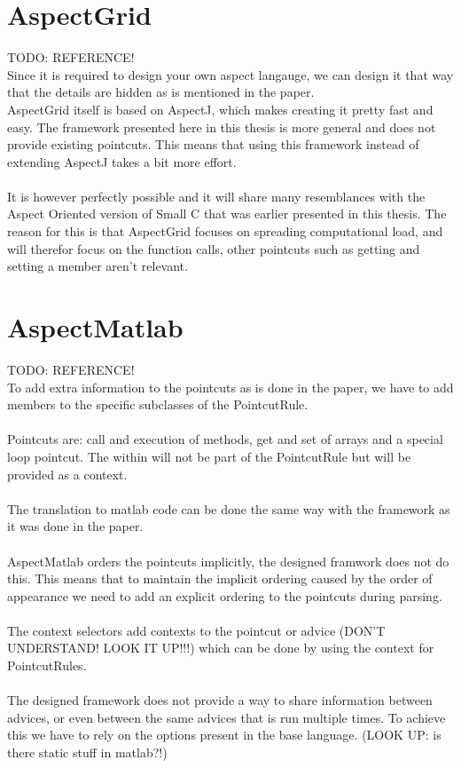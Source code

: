 \documentclass[a4paper]{report}
\begin{document}
\section{AspectGrid}
TODO: REFERENCE!\\
Since it is required to design your own aspect langauge, we can design it that way that the details are hidden as is mentioned in the paper.\\
AspectGrid itself is based on AspectJ, which makes creating it pretty fast and easy. The framework presented here in this thesis is more general and does not provide existing pointcuts. This means that using this framework instead of extending AspectJ takes a bit more effort.\\
\\
It is however perfectly possible and it will share many resemblances with the Aspect Oriented version of Small C that was earlier presented in this thesis. The reason for this is that AspectGrid focuses on spreading computational load, and will therefor focus on the function calls, other pointcuts such as getting and setting a member aren't relevant.
\section{AspectMatlab}
TODO: REFERENCE!\\
To add extra information to the pointcuts as is done in the paper, we have to add members to the specific subclasses of the PointcutRule.\\
\\
Pointcuts are: call and execution of methods, get and set of arrays and a special loop pointcut. The within will not be part of the PointcutRule but will be provided as a context.\\
\\
The translation to matlab code can be done the same way with the framework as it was done in the paper.\\
\\
AspectMatlab orders the pointcuts implicitly, the designed framwork does not do this. This means that to maintain the implicit ordering caused by the order of appearance we need to add an explicit ordering to the pointcuts during parsing.\\
\\
The context selectors add contexts to the pointcut or advice (DON'T UNDERSTAND! LOOK IT UP!!!) which can be done by using the context for PointcutRules.\\
\\
The designed framework does not provide a way to share information between advices, or even between the same advices that is run multiple times. To achieve this we have to rely on the options present in the base language. (LOOK UP: is there static stuff in matlab?!)
\end{document}
